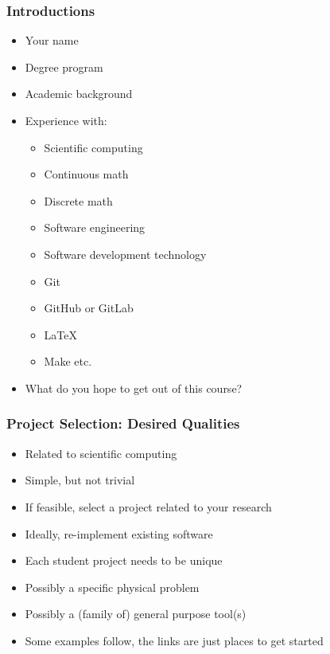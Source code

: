 \documentclass[t,12pt,numbers,fleqn]{beamer}
\begin{document}

\begin{frame}
\frametitle{Introductions}

\begin{itemize}
\item Your name
\item Degree program
\item Academic background
\item Experience with:
\begin{itemize}
\item Scientific computing
\item Continuous math
\item Discrete math
\item Software engineering
\item Software development technology
\bi
\item Git
\item GitHub or GitLab
\item LaTeX
\item Make etc.
\ei
\end{itemize}
\item What do you hope to get out of this course?
\end{itemize}

\end{frame}


\begin{frame}
\frametitle{Project Selection: Desired Qualities}
\begin{itemize}
\item Related to scientific computing
\item Simple, but not trivial
\item If feasible, select a project related to your research
\item Ideally, re-implement existing software
\item Each student project needs to be unique
\item Possibly a specific physical problem
\item Possibly a (family of) general purpose tool(s)
\item Some examples follow, the links are just places to get started
\end{itemize}
\end{frame}

\end{document}
